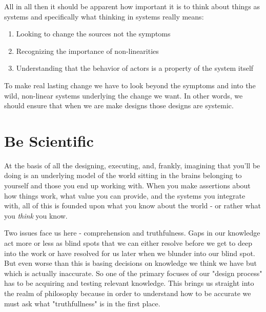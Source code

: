 \documentclass[11pt]{book}
\begin{document}
All in all then it should be apparent how important it is to think about things as systems and specifically what thinking in systems really means:

\begin{enumerate}
\item Looking to change the sources not the symptoms
\item Recognizing the importance of non-linearities
\item Understanding that the behavior of actors is a property of the system itself
\end{enumerate}

To make real lasting change we have to look beyond the symptoms and into the wild, non-linear systems underlying the change we want. In other words, we should ensure that when we are make designs those designs are systemic.  

\section{Be Scientific}
At the basis of all the designing, executing, and, frankly, imagining that you'll be doing is an underlying model of the world sitting in the brains belonging to yourself and those you end up working with. When you make assertions about how things work, what value you can provide, and the systems you integrate with, all of this is founded upon what you know about the world - or rather what you \textit{think} you know. 
\newline

Two issues face us here - comprehension and truthfulness. Gaps in our knowledge act more or less as blind spots that we can either resolve before we get to deep into the work or have resolved for us later when we blunder into our blind spot. But even worse than this is basing decisions on knowledge we think we have but which is actually inaccurate. So one of the primary focuses of our "design process" has to be acquiring and testing relevant knowledge. This brings us straight into the realm of philosophy because in order to understand how to be accurate we must ask what "truthfullness" is in the first place.
\end{document}
